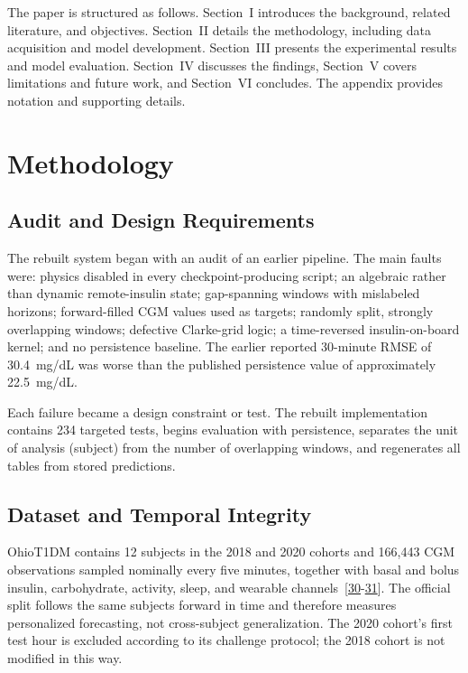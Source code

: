\documentclass[journal]{IEEEtran}
\begin{document}
The paper is structured as follows. Section~I introduces the background, related literature, and objectives. Section~II details the methodology, including data acquisition and model development. Section~III presents the experimental results and model evaluation. Section~IV discusses the findings, Section~V covers limitations and future work, and Section~VI concludes. The appendix provides notation and supporting details.


\section{Methodology}

\subsection{Audit and Design Requirements}


The rebuilt system began with an audit of an earlier pipeline. The main faults were: physics disabled in every checkpoint-producing script; an algebraic rather than dynamic remote-insulin state; gap-spanning windows with mislabeled horizons; forward-filled CGM values used as targets; randomly split, strongly overlapping windows; defective Clarke-grid logic; a time-reversed insulin-on-board kernel; and no persistence baseline. The earlier reported 30-minute RMSE of 30.4~mg/dL was worse than the published persistence value of approximately 22.5~mg/dL.

Each failure became a design constraint or test. The rebuilt implementation contains 234 targeted tests, begins evaluation with persistence, separates the unit of analysis (subject) from the number of overlapping windows, and regenerates all tables from stored predictions.

\subsection{Dataset and Temporal Integrity}

OhioT1DM contains 12 subjects in the 2018 and 2020 cohorts and 166,443 CGM observations sampled nominally every five minutes, together with basal and bolus insulin, carbohydrate, activity, sleep, and wearable channels~[\hyperref[ref30label]{30}-\hyperref[ref31label]{31}]. The official split follows the same subjects forward in time and therefore measures personalized forecasting, not cross-subject generalization. The 2020 cohort's first test hour is excluded according to its challenge protocol; the 2018 cohort is not modified in this way.
\end{document}
